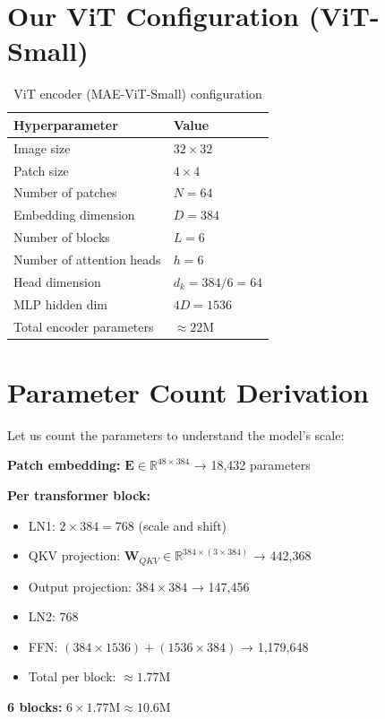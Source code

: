 \documentclass[12pt, a4paper]{report}
\newcommand{\R}{\mathbb{R}}
\newcommand{\mat}[1]{\mathbf{#1}}
\begin{document}
\section{Our ViT Configuration (ViT-Small)}

\begin{table}[H]
\centering
\begin{tabular}{ll}
\toprule
\textbf{Hyperparameter} & \textbf{Value} \\
\midrule
Image size & $32 \times 32$ \\
Patch size & $4 \times 4$ \\
Number of patches & $N = 64$ \\
Embedding dimension & $D = 384$ \\
Number of blocks & $L = 6$ \\
Number of attention heads & $h = 6$ \\
Head dimension & $d_k = 384 / 6 = 64$ \\
MLP hidden dim & $4D = 1536$ \\
Total encoder parameters & $\approx 22$M \\
\bottomrule
\end{tabular}
\caption{ViT encoder (MAE-ViT-Small) configuration}
\end{table}

\section{Parameter Count Derivation}

Let us count the parameters to understand the model's scale:

\textbf{Patch embedding:} $\mat{E} \in \R^{48 \times 384}$ → 18,432 parameters

\textbf{Per transformer block:}
\begin{itemize}
    \item LN1: $2 \times 384 = 768$ (scale and shift)
    \item QKV projection: $\mat{W}_{QKV} \in \R^{384 \times (3 \times 384)}$ → 442,368
    \item Output projection: $384 \times 384$ → 147,456
    \item LN2: $768$
    \item FFN: $(384 \times 1536) + (1536 \times 384)$ → 1,179,648
    \item Total per block: $\approx 1.77$M
\end{itemize}

\textbf{6 blocks:} $6 \times 1.77\text{M} \approx 10.6$M
\end{document}
